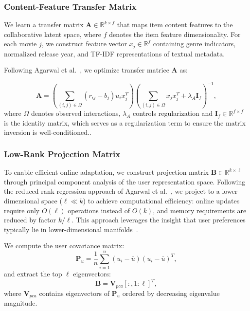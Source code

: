 \documentclass[acmsmall]{acmart}
\begin{document}
\subsubsection{Content-Feature Transfer Matrix}

We learn a transfer matrix $\mathbf{A} \in \mathbb{R}^{k \times f}$ that maps item content features to the collaborative latent space, where $f$ denotes the item feature dimensionality. For each movie $j$, we construct feature vector $x_j \in \mathbb{R}^f$ containing genre indicators, normalized release year, and TF-IDF representations of textual metadata.

Following Agarwal et al.~\cite{agarwal2010fast}, we optimize transfer matrice $\mathbf{A}$ as:

\begin{equation}
\mathbf{A} = \left(\sum_{(i,j) \in \Omega} (r_{ij} - b_j) u_i x_j^T\right) \left(\sum_{(i,j) \in \Omega} x_j x_j^T + \lambda_A \mathbf{I}_f\right)^{-1},
\label{eq:transfer_solution}
\end{equation}
where $\Omega$ denotes observed interactions, $\lambda_A$ controls regularization and $\mathbf{I}_f \in \mathbb{R}^{f \times f}$ is the identity matrix, which serves as a regularization term to ensure the matrix inversion is well-conditioned.. 
\subsubsection{Low-Rank Projection Matrix}


To enable efficient online adaptation, we construct projection matrix $\mathbf{B} \in \mathbb{R}^{k \times \ell}$ through principal component analysis of the user representation space. Following the reduced-rank regression approach of Agarwal et al.~\cite{agarwal2010fast}, we project to a lower-dimensional space ($\ell \ll k$) to achieve computational efficiency: online updates require only $O(\ell)$ operations instead of $O(k)$, and memory requirements are reduced by factor $k/\ell$. This approach leverages the insight that user preferences typically lie in lower-dimensional manifolds~\cite{koren2009matrix}.

We compute the user covariance matrix:
\begin{equation}
\mathbf{P}_u = \frac{1}{n} \sum_{i=1}^n (u_i - \bar{u})(u_i - \bar{u})^T,
\label{eq:user_covariance}
\end{equation}
and extract the top $\ell$ eigenvectors:
\begin{equation}
\mathbf{B} = \mathbf{V}_{pca}[:, 1:\ell]^T,
\label{eq:B_matrix_pca}
\end{equation}
where $\mathbf{V}_{pca}$ contains eigenvectors of $\mathbf{P}_u$ ordered by decreasing eigenvalue magnitude.
\end{document}

